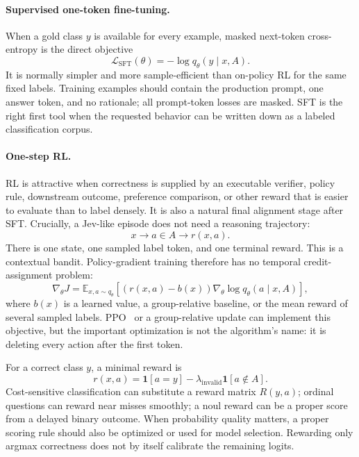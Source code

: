 \documentclass[11pt]{article}
\begin{document}
\paragraph{Supervised one-token fine-tuning.}
When a gold class $y$ is available for every example, masked next-token
cross-entropy is the direct objective
\begin{equation}
\mathcal{L}_{\mathrm{SFT}}(\theta)
= -\log q_\theta(y\mid x,A).
\label{eq:sft}
\end{equation}
It is normally simpler and more sample-efficient than on-policy RL for the
same fixed labels.  Training examples should contain the production prompt,
one answer token, and no rationale; all prompt-token losses are masked.  SFT
is the right first tool when the requested behavior can be written down as a
labeled classification corpus.

\paragraph{One-step RL.}
RL is attractive when correctness is supplied by an executable verifier,
policy rule, downstream outcome, preference comparison, or other reward that
is easier to evaluate than to label densely.  It is also a natural final
alignment stage after SFT.  Crucially, a Jev-like episode does not need a
reasoning trajectory:
\[
x \longrightarrow a\in A \longrightarrow r(x,a).
\]
There is one state, one sampled label token, and one terminal reward.  This
is a contextual bandit.  Policy-gradient training therefore has no temporal
credit-assignment problem:
\begin{equation}
\nabla_\theta J =
\mathbb{E}_{x,a\sim q_\theta}
\left[(r(x,a)-b(x))\nabla_\theta\log q_\theta(a\mid x,A)\right],
\label{eq:pg}
\end{equation}
where $b(x)$ is a learned value, a group-relative baseline, or the mean
reward of several sampled labels.  PPO~\cite{ppo} or a group-relative update
can implement this objective, but the important optimization is not the
algorithm's name: it is deleting every action after the first token.

For a correct class $y$, a minimal reward is
\begin{equation}
r(x,a)=\mathbf{1}[a=y]-\lambda_{\mathrm{invalid}}
\mathbf{1}[a\notin A].
\end{equation}
Cost-sensitive classification can substitute a reward matrix $R(y,a)$;
ordinal questions can reward near misses smoothly; a noul reward can be a
proper score from a delayed binary outcome.  When probability quality matters,
a proper scoring rule should also be optimized or used for model selection.
Rewarding only argmax correctness does not by itself calibrate the remaining
logits.
\end{document}
